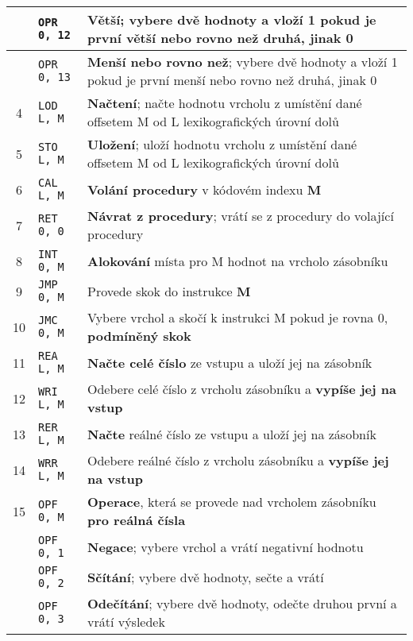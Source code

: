 \documentclass[
12pt,
a4paper,
pdftex,
czech
]{report}
\begin{document}
\begin{table}[]
\begin{longtable}{|c|l|p{10cm}|}
\rule{0pt}{3ex} & \texttt{OPR 0, 12} & \textbf{Větší}; vybere dvě hodnoty a vloží 1 pokud je první větší nebo rovno než druhá, jinak 0 \\ \hline
\rule{0pt}{3ex} & \texttt{OPR 0, 13} & \textbf{Menší nebo rovno než}; vybere dvě hodnoty a vloží 1 pokud je první menší nebo rovno než druhá, jinak 0 \\ \hline
\rule{0pt}{3ex}4 & \texttt{LOD L, M} & \textbf{Načtení}; načte hodnotu vrcholu z umístění dané offsetem M od L lexikografických úrovní dolů \\ \hline
\rule{0pt}{3ex}5 & \texttt{STO L, M} & \textbf{Uložení}; uloží hodnotu vrcholu z umístění dané offsetem M od L lexikografických úrovní dolů \\ \hline
\rule{0pt}{3ex}6 & \texttt{CAL L, M} & \textbf{Volání procedury} v kódovém indexu \textbf{M} \\ \hline
\rule{0pt}{3ex}7 & \texttt{RET 0, 0} & \textbf{Návrat z procedury}; vrátí se z procedury do volající procedury \\ \hline
\rule{0pt}{3ex}8 & \texttt{INT 0, M} & \textbf{Alokování} místa pro M hodnot na vrcholo zásobníku \\ \hline
\rule{0pt}{3ex}9 & \texttt{JMP 0, M} & Provede skok do instrukce \textbf{M} \\ \hline
\rule{0pt}{3ex}10 & \texttt{JMC 0, M} & Vybere vrchol a skočí k instrukci M pokud je rovna 0, \textbf{podmíněný skok} \\ \hline
\rule{0pt}{3ex}11 & \texttt{REA L, M} & \textbf{Načte celé číslo} ze vstupu a uloží jej na zásobník \\ \hline
\rule{0pt}{3ex}12 & \texttt{WRI L, M} & Odebere celé číslo z vrcholu zásobníku a \textbf{vypíše jej na vstup} \\ \hline
\rule{0pt}{3ex}13 & \texttt{RER L, M} & \textbf{Načte} reálné číslo ze vstupu a uloží jej na zásobník \\ \hline
\rule{0pt}{3ex}14 & \texttt{WRR L, M} & Odebere reálné číslo z vrcholu zásobníku a \textbf{vypíše jej na vstup} \\ \hline
\rule{0pt}{3ex}15 & \texttt{OPF 0, M} & \textbf{Operace}, která se provede nad vrcholem zásobníku \textbf{pro reálná čísla} \\ \hline
\rule{0pt}{3ex} & \texttt{OPF 0, 1} & \textbf{Negace}; vybere vrchol a vrátí negativní hodnotu \\ \hline
\rule{0pt}{3ex} & \texttt{OPF 0, 2} & \textbf{Sčítání}; vybere dvě hodnoty, sečte a vrátí \\ \hline
\rule{0pt}{3ex} & \texttt{OPF 0, 3} & \textbf{Odečítání}; vybere dvě hodnoty, odečte druhou první a vrátí výsledek \\ \hline

\end{longtable}
\end{table}
\end{document}
